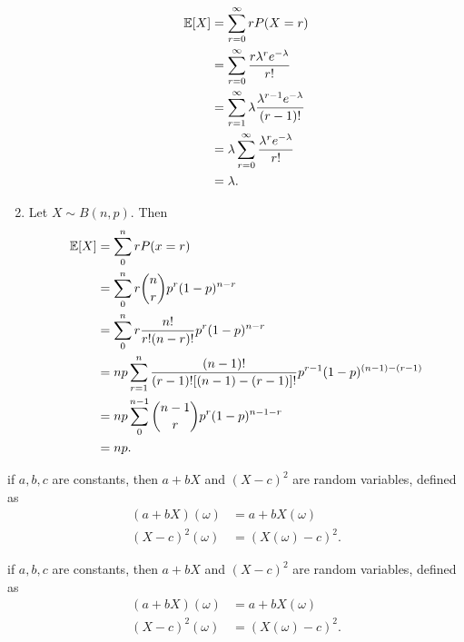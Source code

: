 \begin{note}
\begin{field}
\begin{eg}
\begin{enumerate}
\begin{align*}
            \mathbb{E}[X] &= \sum_{r = 0}^\infty rP(X = r)\\
            &= \sum_{r = 0}^\infty \frac{r \lambda^r e^{-\lambda}}{r!}\\
            &= \sum_{r = 1}^\infty \lambda \frac{\lambda^{r - 1}e^{-\lambda}}{(r - 1)!}\\
            &= \lambda\sum_{r = 0}^\infty\frac{\lambda^r e^{-\lambda}}{r!}\\
            &= \lambda.
          \end{align*}
        \item Let $X\sim B(n, p)$. Then
          \begin{align*}
            \mathbb{E}[X] &= \sum_0^n rP(x = r)\\
            &= \sum_0^n r\binom{n}{r} p^r(1 - p)^{n - r}\\
            &= \sum_0^n r\frac{n!}{r!(n - r)!}p^r (1 - p)^{n - r}\\
            &= np\sum_{r = 1}^n \frac{(n - 1)!}{(r - 1)![(n - 1) - (r - 1)]!}p^{r - 1}(1 - p)^{(n - 1) - (r - 1)}\\
            &= np\sum_{0}^{n - 1}\binom{n - 1}{r}p^r(1 - p)^{n - 1 - r}\\
            &= np.
          \end{align*}
      \end{enumerate}
    \end{eg}
  \end{field}
  \xplain{}%
\end{note}

\begin{note}
  \begin{field}
    \begin{eg}
      if $a, b, c$ are constants, then $a + bX$ and $(X - c)^2$ are random variables, defined as
      \begin{align*}
        (a + bX)(\omega) &= a + bX(\omega)\\
        (X - c)^2(\omega) &= (X(\omega) - c)^2.
      \end{align*}
    \end{eg}
  \end{field}
  \begin{field}
    \begin{eg}
      if $a, b, c$ are constants, then $a + bX$ and $(X - c)^2$ are random variables, defined as
      \begin{align*}
        (a + bX)(\omega) &= a + bX(\omega)\\
        (X - c)^2(\omega) &= (X(\omega) - c)^2.
      \end{align*}
    \end{eg}
  \end{field}
  \xplain{}%
\end{note}

